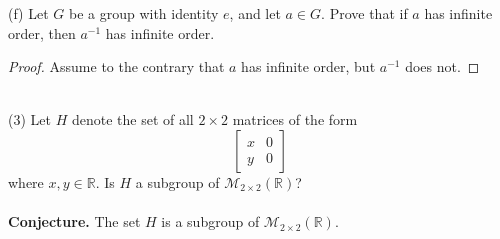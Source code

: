 \documentclass[11pt,a4paper]{article}
\begin{document}
(f) Let $G$ be a group with identity $e$, and let $a \in G$. Prove that if $a$ has infinite
order, then $a^{-1}$ has infinite order.

\begin{proof}
Assume to the contrary that $a$ has infinite order, but $a^{-1}$ does not.
\end{proof}
~\\
(3) Let $H$ denote the set of all $2 \times 2$ matrices of the form
\[\begin{bmatrix}
x&0\\
y&0
\end{bmatrix}\]
where $x,y\in\mathbb{R}$. Is $H$ a subgroup of $\mathcal{M}_{2\times 2}(\mathbb{R})$?\\
~\\
{\bf Conjecture.} The set $H$ is a subgroup of $\mathcal{M}_{2\times 2}(\mathbb{R})$.
\end{document}
